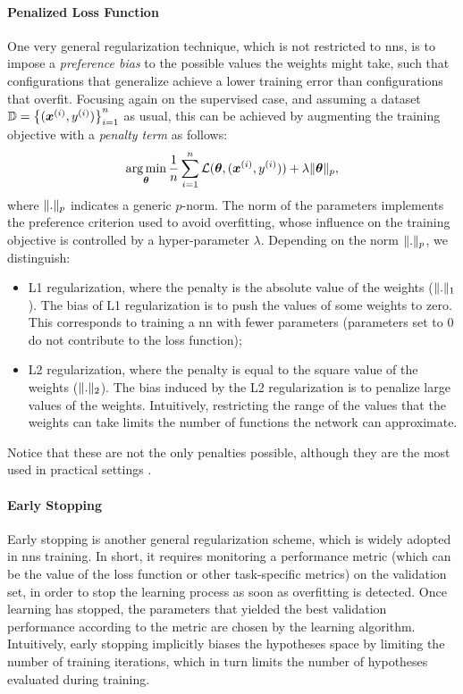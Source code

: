 \paragraph{Penalized Loss Function}
One very general regularization technique, which is not restricted to \glspl{nn}, is to impose a \emph{preference bias} to the possible values the weights might take, such that configurations that generalize achieve a lower training error than configurations that overfit. Focusing again on the supervised case, and assuming a dataset $\Data = \Set{(\PatternVector{x}{i}, \Pattern{y}{i})}_{i=1}^n$ as usual, this can be achieved by augmenting the training objective with a \emph{penalty term} as follows:
$$\argmin_{\Param} \frac{1}{n} \sum_{i=1}^n \Loss(\Param, (\PatternVector{x}{i}, \Pattern{y}{i})) + \lambda\norm{\Param}_p,$$
where $\mathopen\| . \mathclose\|_p$ indicates a generic $p$-norm. The norm of the parameters implements the preference criterion used to avoid overfitting, whose influence on the training objective is controlled by a hyper-parameter $\lambda$. Depending on the norm $\mathopen\| . \mathclose\|_p$, we distinguish:
\begin{itemize}
    \item L1 regularization, where the penalty is the absolute value of the weights ($\mathopen\| . \mathclose\|_1$). The bias of L1 regularization is to push the values of some weights to zero. This corresponds to training a \gls{nn} with fewer parameters (parameters set to 0 do not contribute to the loss function);
    \item L2 regularization, where the penalty is equal to the square value of the weights ($\mathopen\| . \mathclose\|_2$). The bias induced by the L2 regularization is to penalize large values of the weights. Intuitively, restricting the range of the values that the weights can take limits the number of functions the network can approximate.
\end{itemize}
Notice that these are not the only penalties possible, although they are the most used in practical settings \citep{hastie2009elements}.

\paragraph{Early Stopping}
Early stopping \citep{prechelt1998earlystopping} is another general regularization scheme, which is widely adopted in \glspl{nn} training. In short, it requires monitoring a performance metric (which can be the value of the loss function or other task-specific metrics) on the validation set, in order to stop the learning process as soon as overfitting is detected. Once learning has stopped, the parameters that yielded the best validation performance according to the metric are chosen by the learning algorithm. Intuitively, early stopping implicitly biases the hypotheses space by limiting the number of training iterations, which in turn limits the number of hypotheses evaluated during training.

